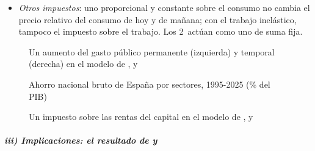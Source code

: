 \documentclass[11pt]{article}
\begin{document}
\begin{itemize}
  El lugar $\dot{\tilde c}=0$ se desplaza a la izquierda: el nuevo estado estacionario tiene menos capital, menos renta y menos consumo. En el momento de la subida, el consumo salta hacia arriba y después la economía desacumula capital (gráfico~\ref{fig:rck-impuesto}, el mismo que en otro tema ).
\item \emph{Otros impuestos}: uno proporcional y constante sobre el consumo no cambia el precio relativo del consumo de hoy y de mañana; con el trabajo inelástico, tampoco el impuesto sobre el trabajo. Los 2~actúan como uno de suma fija.
\end{itemize}

\begin{figure}[H]
\centering
\caption{Un aumento del gasto público permanente (izquierda) y temporal (derecha) en el modelo de ,  y }\label{fig:rck-gasto}
\end{figure}

\begin{figure}[H]
\centering
\caption{Ahorro nacional bruto de España por sectores, 1995-2025 (\% del PIB)}\label{fig:ahorro-nacional-espana}
\end{figure}

\begin{figure}[H]
\centering
\caption{Un impuesto sobre las rentas del capital en el modelo de ,  y }\label{fig:rck-impuesto}
\end{figure}

\subparagraph{iii) Implicaciones: el resultado de  y }
\end{document}
